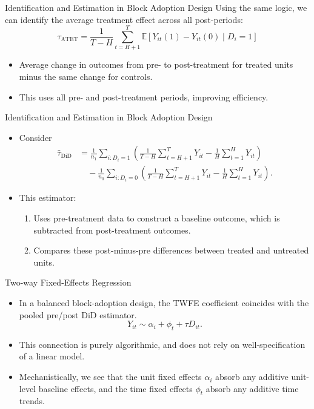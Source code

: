 \documentclass[11pt,aspectratio=169]{beamer}
\newcommand{\E}{\mathbb{E}}
\begin{document}
\begin{frame}{Identification and Estimation in Block Adoption Design}
Using the same logic, we can identify the average treatment effect across all post-periods:
\[\tau_{\text{ATET}}=\frac{1}{T-H}\sum_{t=H+1}^{T}\E[Y_{it}(1)-Y_{it}(0)\mid D_i=1]\]
\begin{itemize}
  \item Average change in outcomes from pre- to post-treatment for treated units minus the same change for controls.
  \item This uses all pre- and post-treatment periods, improving efficiency.
\end{itemize}
\end{frame}

\begin{frame}{Identification and Estimation in Block Adoption Design}
\begin{itemize}
  \item Consider
  \[
  \begin{aligned}
    \widehat\tau_{\text{DiD}}
    &=\frac{1}{n_1}\sum_{i:D_i=1}\left(\frac{1}{T-H}\sum_{t=H+1}^{T}Y_{it}-\frac{1}{H}\sum_{t=1}^{H}Y_{it}\right)\\
    &\quad-\frac{1}{n_0}\sum_{i:D_i=0}\left(\frac{1}{T-H}\sum_{t=H+1}^{T}Y_{it}-\frac{1}{H}\sum_{t=1}^{H}Y_{it}\right).
  \end{aligned}
  \]
  \item This estimator:
  \begin{enumerate}
    \item Uses pre-treatment data to construct a baseline outcome, which is subtracted from post-treatment outcomes.
    \item Compares these post-minus-pre differences between treated and untreated units.
  \end{enumerate}
\end{itemize}
\end{frame}

\begin{frame}{Two-way Fixed-Effects Regression}
\begin{itemize}
  \item In a balanced block-adoption design, the TWFE coefficient coincides with the pooled pre/post DiD estimator.
  \[Y_{it}\sim\alpha_i+\phi_t+\tau D_{it}.\]
  \item This connection is purely algorithmic, and does not rely on well-specification of a linear model.
  \item Mechanistically, we see that the unit fixed effects $\alpha_i$ absorb any additive unit-level baseline effects, and the time fixed effects $\phi_t$ absorb any additive time trends.
\end{itemize}
\end{frame}
\end{document}

